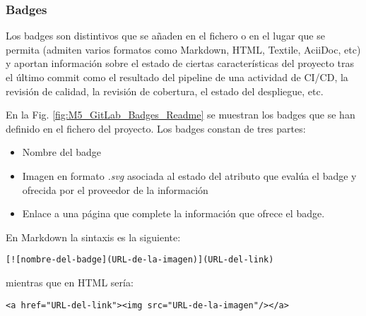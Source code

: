 \subsubsection{Badges}

Los badges son distintivos que se añaden en el fichero  o en el lugar que se permita (admiten varios formatos como Markdown, HTML, Textile, AciiDoc, etc) y aportan información sobre el estado de ciertas características del proyecto tras el último commit como el resultado del pipeline de una actividad de CI/CD, la revisión de calidad, la revisión de cobertura, el estado del despliegue, etc.

En la Fig. \ref{fig:M5_GitLab_Badges_Readme} se muestran los badges que se han definido en el fichero  del proyecto. Los badges constan de tres partes:
\begin{itemize}
	\tightlist
	\item Nombre del badge
	\item Imagen en formato \textit{.svg} asociada al estado del atributo que evalúa el badge y ofrecida por el proveedor de la información
	\item Enlace a una página que complete la información que ofrece el badge.
\end{itemize}

En Markdown la sintaxis es la siguiente:\\
\begin{minipage}{\linewidth}
{\tiny
\begin{lstlisting}[breaklines]
[![nombre-del-badge](URL-de-la-imagen)](URL-del-link)
\end{lstlisting}
}
\end{minipage}
mientras que en HTML sería:\\
\begin{minipage}{\linewidth}
{\tiny
\begin{lstlisting}[breaklines]
<a href="URL-del-link"><img src="URL-de-la-imagen"/></a>
\end{lstlisting}
}
\end{minipage}


